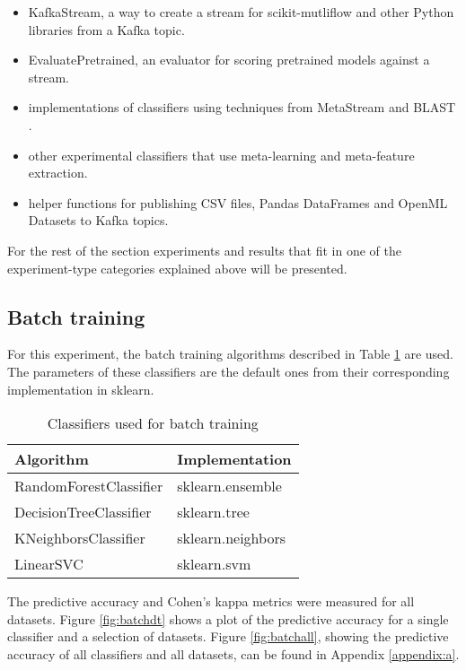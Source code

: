 \documentclass{sig-alternate-br}
\begin{document}
\begin{itemize}
    \item KafkaStream, a way to create a stream for scikit-mutliflow and other Python libraries from a Kafka topic.
    \item EvaluatePretrained, an evaluator for scoring pretrained models against a stream.
    \item implementations of classifiers using techniques from MetaStream \cite{rossi2014metastream} and BLAST \cite{van2018online}.
    \item other experimental classifiers that use meta-learning and meta-feature extraction.
    \item helper functions for publishing CSV files, Pandas DataFrames and OpenML Datasets to Kafka topics.
\end{itemize}

For the rest of the section experiments and results that fit in one of the experiment-type categories explained above will be presented.

\subsection{Batch training}

For this experiment, the batch training algorithms described in Table \ref{table:batch_algos} are used. The parameters of these classifiers are the default ones from their corresponding implementation in sklearn. 

\begin{table}[h]
\centering
\renewcommand{\arraystretch}{1.25}
\begin{tabular}{|l|l|} \hline
\textbf{Algorithm} & \textbf{Implementation}\\ \hline
RandomForestClassifier & sklearn.ensemble \\ \hline
DecisionTreeClassifier & sklearn.tree \\ \hline
KNeighborsClassifier & sklearn.neighbors \\ \hline
LinearSVC & sklearn.svm \\ \hline
\end{tabular}
\caption{Classifiers used for batch training}
\label{table:batch_algos}
\end{table}

The predictive accuracy and Cohen's kappa metrics were measured for all datasets. Figure \ref{fig:batchdt} shows a plot of the predictive accuracy for a single classifier and a selection of datasets. Figure \ref{fig:batchall}, showing the predictive accuracy of all classifiers and all datasets, can be found in Appendix \ref{appendix:a}.
\end{document}
